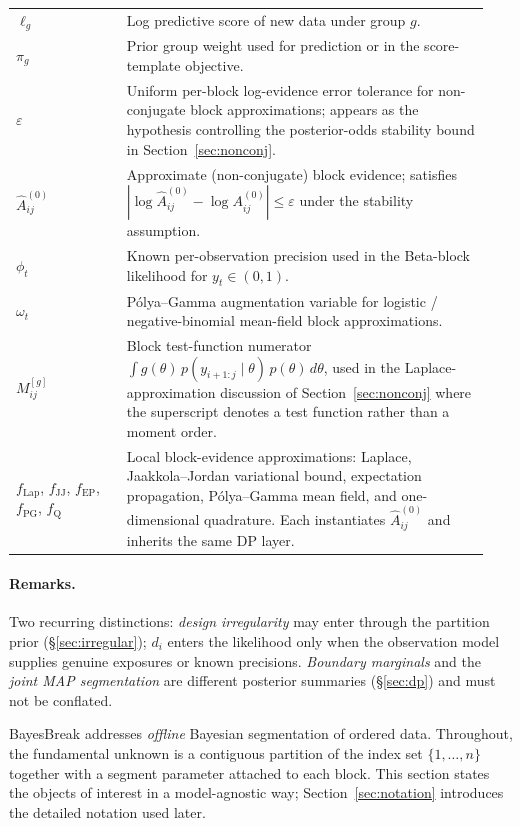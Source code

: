 \begin{longtable}{@{}p{0.22\linewidth}p{0.72\linewidth}@{}}
$\ell_g$ & Log predictive score of new data under group $g$. \\
$\pi_g$ & Prior group weight used for prediction or in the score-template objective. \\
\midrule
$\varepsilon$ & Uniform per-block log-evidence error tolerance for non-conjugate block approximations; appears as the hypothesis controlling the posterior-odds stability bound in Section~\ref{sec:nonconj}. \\
$\widehat A^{(0)}_{ij}$ & Approximate (non-conjugate) block evidence; satisfies $|\log\widehat A^{(0)}_{ij} - \log A^{(0)}_{ij}| \le \varepsilon$ under the stability assumption. \\
$\phi_t$ & Known per-observation precision used in the Beta-block likelihood for $y_t\in(0,1)$. \\
$\omega_t$ & P\'olya--Gamma augmentation variable for logistic / negative-binomial mean-field block approximations. \\
$M^{[g]}_{ij}$ & Block test-function numerator $\int g(\theta)\, p(y_{i+1:j}\mid \theta)\, p(\theta)\, d\theta$, used in the Laplace-approximation discussion of Section~\ref{sec:nonconj} where the superscript denotes a test function rather than a moment order. \\
\midrule
$f_{\mathrm{Lap}}$, $f_{\mathrm{JJ}}$, $f_{\mathrm{EP}}$, $f_{\mathrm{PG}}$, $f_{\mathrm{Q}}$ & Local block-evidence approximations:
Laplace, Jaakkola--Jordan variational bound, expectation propagation, P\'olya--Gamma mean field,
and one-dimensional quadrature. Each instantiates $\widehat A^{(0)}_{ij}$ and inherits the same DP layer. \\
\bottomrule
\end{longtable}

\paragraph{Remarks.}
Two recurring distinctions: \emph{design irregularity} may enter through the partition prior
(\S\ref{sec:irregular}); $d_i$ enters the likelihood only when the observation model supplies
genuine exposures or known precisions. \emph{Boundary marginals} and the \emph{joint MAP
segmentation} are different posterior summaries (\S\ref{sec:dp}) and must not be conflated.

\label{sec:problem}

BayesBreak addresses \emph{offline} Bayesian segmentation of ordered data. Throughout, the
fundamental unknown is a contiguous partition of the index set $\{1,\dots,n\}$ together with a
segment parameter attached to each block. This section states the objects of interest in a
model-agnostic way; Section~\ref{sec:notation} introduces the detailed notation used later.

